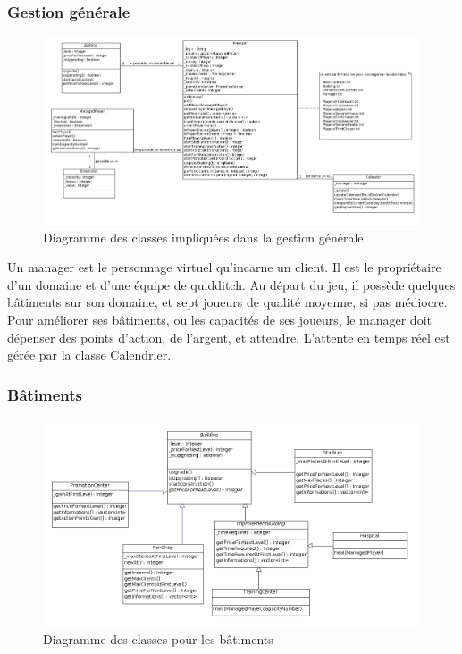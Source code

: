 \documentclass[a4paper,titlepage]{scrreprt}
\begin{document}
      \subsubsection{Gestion générale}
          \begin{figure}[H]
          \center
          \includegraphics[scale=0.35]{uml/class/Management.png}
         \caption{Diagramme des classes impliquées dans la gestion générale}
         \end{figure}

        Un manager est le personnage virtuel qu'incarne un client. Il est le propriétaire d'un domaine et d'une équipe de quidditch. Au départ du jeu, il possède quelques bâtiments sur son domaine, et sept joueurs de qualité moyenne, si pas médiocre. Pour améliorer ses bâtiments, ou les capacités de ses joueurs, le manager doit dépenser des points d'action, de l'argent, et attendre. L'attente en temps réel est gérée par la classe Calendrier.


      \subsubsection{Bâtiments}
          \begin{figure}[H]
          \center
          \includegraphics[scale=0.4]{uml/class/Buildings.png}
         \caption{Diagramme des classes pour les bâtiments}
         \end{figure}
\end{document}
